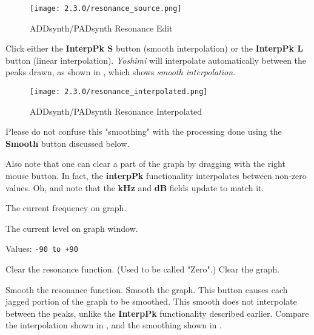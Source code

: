    \begin{figure}[H]
      \centering
      \texttt{[image: 2.3.0/resonance\_source.png]}
      \caption{ADDsynth/PADsynth Resonance Edit}
      \label{fig:addsynth_resonance_edit}
   \end{figure}

   Click either the \textbf{InterpPk S} button (smooth interpolation) or the \textbf{InterpPk L}
   button (linear interpolation). \textsl{Yoshimi} will interpolate automatically between the peaks
   drawn, as shown in , which shows \textsl{smooth
   interpolation}.

   \begin{figure}[H]
      \centering
      \texttt{[image: 2.3.0/resonance\_interpolated.png]}
      \caption{ADDsynth/PADsynth Resonance Interpolated}
      \label{fig:addsynth_resonance_interpolated}
   \end{figure}


   Please do not confuse this "smoothing" with the processing done using the
   \textbf{Smooth} button discussed below.

   Also note that one can clear a part of the graph
   by dragging with the right mouse button. In fact, the \textbf{interpPk}
   functionality interpolates between non-zero values.
   Oh, and note that the \textbf{kHz} and \textbf{dB} fields update to match it.

   The current frequency on graph.

   The current level on graph window.

   Values: \texttt{-90 to +90}

   Clear the resonance function.  (Used to be called "Zero".)
   Clear the graph.

   Smooth the resonance function.
   Smooth the graph.
   This button causes each jagged portion of the graph to be smoothed.
   This smooth does not interpolate between the peaks, unlike the
   \textbf{InterpPk} functionality described earlier.  Compare the
   interpolation shown in ,
   and the smoothing shown in .

